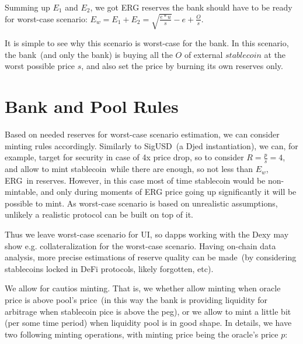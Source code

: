 \documentclass{article}   %
\newcommand{\bc}{ERG}
\newcommand{\sct}{stablecoin}
\newcommand{\dx}{Dexy}
\begin{document}
Summing up $E_1$ and $E_2$, we got \bc{} reserves the bank should have to be ready for worst-case scenario: $E_w = E_1 + E_2 = \sqrt{\frac{e * u}{s}} - e + \frac{O}{s}$.

It is simple to see why this scenario is worst-case for the bank. In this scenario, the bank~(and only the bank) is buying all the $O$ of external $\sct{}$ at the worst possible price $s$, and also set the price by burning its own reserves only.  

\section{Bank and Pool Rules}

Based on needed reserves for worst-case scenario estimation, we can consider minting rules accordingly. Similarly to SigUSD~(a Djed instantiation), we can, for example, target for security in case of 
4x price drop, so to consider $R = \frac{p}{s} = 4$, and allow to mint \sct{}~while there are enough, so not less than $E_w$, \bc{}~in reserves. However, in this case most of time \sct{} would be non-mintable, and only during moments of \bc{} price going up significantly it will be possible to mint. As worst-case scenario is based on unrealistic assumptions, unlikely a realistic protocol can be built on top of it.  

Thus we leave worst-case scenario for UI, so dapps working with the \dx{} may show e.g. collateralization for the worst-case scenario. Having on-chain data analysis, 
more precise estimations of reserve quality can be made~(by considering \sct{}s locked in DeFi protocols, likely forgotten, etc).

We allow for cautios minting. That is, we whether allow minting when oracle price is above pool's price~(in this way the bank is providing liquidity for arbitrage when \sct{} pice is above the peg), or we allow to mint a little bit (per some time period) when liquidity pool is in good shape. In details, we have two following minting operations, with minting price being the oracle's price $p$:  
\end{document}
